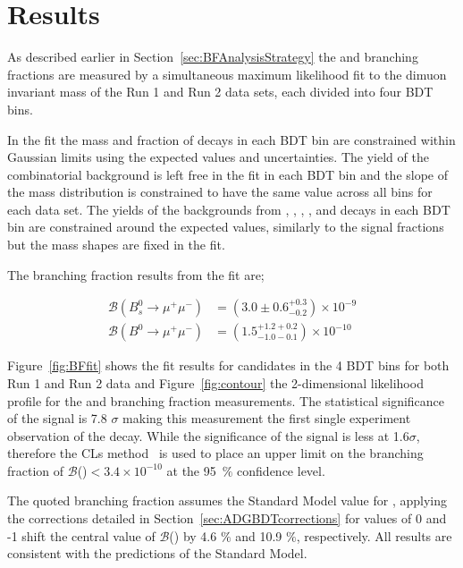 {{\section{Results}
\label{sec:BFResults}

As described earlier in Section~\ref{sec:BFAnalysisStrategy} the \bsmumu and \bmumu branching fractions are measured by a simultaneous maximum likelihood fit to the dimuon invariant mass of the Run 1 and Run 2 data sets, each divided into four BDT bins. 

In the fit the mass \pdfs and fraction of \bmumu decays in each BDT bin are constrained within Gaussian limits using the expected values and uncertainties. The yield of the combinatorial background is left free in the fit in each BDT bin and the slope of the mass distribution is constrained to have the same value across all bins for each data set. The yields of the backgrounds from \bhh, \bdpimunu, \bsKmunu, \bpimumu, \bdpimumu and \bcjpsimunu decays in each BDT bin are constrained around the expected values, similarly to the signal fractions but the mass shapes are fixed in the fit.

The branching fraction results from the fit are;

\begin{equation}
\begin{split}
  \mathcal{B}(B^{0}_{s} \to \mu^{+} \mu^{-}) &= (3.0 \pm 0.6^{+0.3}_{-0.2}) \times 10^{-9} \\
  \mathcal{B}(B^{0} \to \mu^{+} \mu^{-}) &= (1.5^{+1.2 +0.2}_{-1.0 -0.1})    \times 10^{-10} 
\end{split}
\label{eq:BFresults}
\end{equation}

Figure~\ref{fig:BFfit} shows the fit results for \bmumu candidates in the 4 BDT bins for both Run 1 and Run 2 data and Figure~\ref{fig:contour} the 2-dimensional likelihood profile for the \bdmumu and \bsmumu branching fraction measurements.
The statistical significance of the \bsmumu signal is 7.8 $\sigma$ making this measurement the first single experiment observation of the \bsmumu decay. While the significance of the \bdmumu signal is less at 1.6$\sigma$, therefore the CLs method~\cite{} is used to place an upper limit on the branching fraction of $\mathcal{B}$(\bdmumu)$ < 3.4 \times 10^{-10}$  at the 95~$\%$ confidence level.

The quoted \bsmumu branching fraction assumes the Standard Model value for \ADG, applying the corrections detailed in Section~\ref{sec:ADGBDTcorrections} for \ADG values of 0 and -1 shift the central value of $\mathcal{B}$(\bsmumu) by 4.6 $\%$ and 10.9 $\%$, respectively. All results are consistent with the predictions of the Standard Model.



}}
